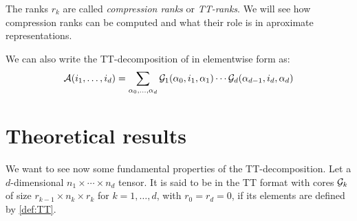 The ranks $r_k$ are called \emph{compression ranks} or \emph{TT-ranks}. We will see how compression ranks can be computed and what their role is in aproximate representations.

We can also write the TT-decomposition of \A in elementwise form as:
\begin{equation} \label{def:TTindex}
  \mathcal{A}(i_1,\dots,i_d) = \sum_{\alpha_0,\dots,\alpha_d} \mathcal{G}_1(\alpha_0,i_1,\alpha_1) \cdots \mathcal{G}_d(\alpha_{d-1},i_d,\alpha_d)
\end{equation}

\section{Theoretical results}
We want to see now some fundamental properties of the TT-decomposition. Let \A a $d$-dimensional $n_1 \times \cdots \times n_d$ tensor. It is said to be in the TT format with cores $\mathcal{G}_k$ of size $r_{k-1} \times n_k \times r_k$ for $k=1,\ldots ,d$, with $r_0 = r_d = 0$, if its elements are defined by \ref{def:TT}.

